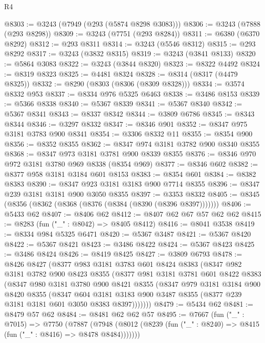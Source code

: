\begin{lexlean}{R4}
\begin{coremodule}
@8303 := @3243 (@7949 (@293 (@5874 @8298 @3083)))
@8306 := @3243 (@7888 (@293 @8298))
@8309 := @3243 (@7751 (@293 @8284))
@8311 := @6380 (@6370 @8292)
@8312 := @293 @8311
@8314 := @3243 (@5546 @8312)
@8315 := @293 @8292
@8317 := @3243 (@3832 @8315)
@8319 := @3243 (@3841 @8133)
@8320 := @5864 @3083
@8322 := @3243 (@3844 @8320)
@8323 := @8322 @4492
@8324 := @8319 @8323
@8325 := @4481 @8324
@8328 := @8314 (@8317 (@4479 @8325))
@8332 := @8290 (@8303 (@8306 (@8309 @8328)))
@8334 := @3574 @8332 @953
@8337 := @8334 @976 @5325 @6463
@8338 := @3486 @8153
@8339 := @5366 @8338
@8340 := @5367 @8339
@8341 := @5367 @8340
@8342 := @5367 @8341
@8343 := @8337 @8342
@8344 := @3809 @6786
@8345 := @8343 @8344
@8346 := @3297 @8332
@8347 := @8346 @901
@8352 := @8347 @975 @3181 @3783 @900 @8341
@8354 := @3306 @8332 @11
@8355 := @8354 @900
@8356 := @8352 @8355
@8362 := @8347 @974 @3181 @3782 @900 @8340 @8355
@8368 := @8347 @973 @3181 @3781 @900 @8339 @8355
@8376 := @8346 @970 @972 @3181 @3780 @969 @8338 (@8354 @969)
@8377 := @8346 @602
@8382 := @8377 @958 @3181 @3184 @601 @8153
@8383 := @8354 @601
@8384 := @8382 @8383
@8390 := @8347 @923 @3181 @3183 @900 @7714 @8355
@8396 := @8347 @239 @3181 @3181 @900 @3050 @8355
@8397 := @3353 @8332
@8405 := @8345 (@8356 (@8362 (@8368 (@8376 (@8384 (@8390 (@8396 @8397)))))))
@8406 := @5433 @62
@8407 := @8406 @62
@8412 := @8407 @62 @67 @57 @62 @62
@8415 := @8283 (fun ("_" : @8042) => @8405 @8412)
@8416 := @8041 @3538
@8419 := @8334 @984 @5325 @6471
@8420 := @5367 @3487
@8421 := @5367 @8420
@8422 := @5367 @8421
@8423 := @3486 @8422
@8424 := @5367 @8423
@8425 := @3486 @8424
@8426 := @8419 @8425
@8427 := @3809 @6793
@8478 := @8426
    @8427
    (@8377
      @983
      @3181
      @3783
      @601
      @8424
      @8383
      (@8347
        @982
        @3181
        @3782
        @900
        @8423
        @8355
        (@8377
          @981
          @3181
          @3781
          @601
          @8422
          @8383
          (@8347
            @980
            @3181
            @3780
            @900
            @8421
            @8355
            (@8347
              @979
              @3181
              @3184
              @900
              @8420
              @8355
              (@8347
                @604
                @3181
                @3183
                @900
                @3487
                @8355
                (@8377 @239 @3181 @3181 @601 @3050 @8383 @8397)))))))
@8479 := @5434 @62
@8481 := @8479 @57 @62
@8484 := @8481 @62 @62 @57
@8495 := @7667
    (fun ("_" : @7015) =>
    @7750
      (@7887
        (@7948 (@8012 (@8239 (fun ("_" : @8240) => @8415 (fun ("_" : @8416) => @8478 @8484)))))))

\end{coremodule}
\end{lexlean}
